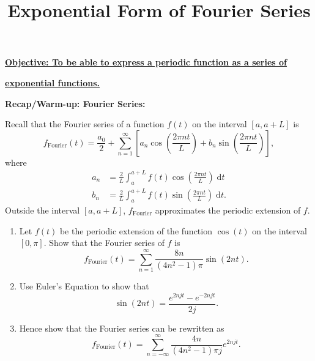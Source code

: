 \documentclass{article}
\newcommand{\diff}{\;\mathrm{d}}
\begin{document}
\title{Exponential Form of Fourier Series}
\date{}

\maketitle
\thispagestyle{empty}

\Large

\textbf{\underline{Objective: To be able to express a periodic function as a series of}}

\textbf{\underline{exponential functions.}}






\vspace{5mm}



\textbf{Recap/Warm-up: Fourier Series:}\bigskip



Recall that the Fourier series of a function $f(t)$ on the interval $[a,a+L]$ is
\[f_\mathrm{Fourier}(t)=\frac{a_0}{2}+\sum_{n=1}^\infty \left[a_n\cos\left(\frac{2\pi nt}{L}\right) + b_n\sin\left(\frac{2\pi nt}{L}\right)\right],\]
where
\begin{align*}
	a_n&=\frac{2}{L}\int_a^{a+L} f(t)\cos\left(\frac{2\pi nt}{L}\right)\diff t\\
	b_n&=\frac{2}{L}\int_a^{a+L} f(t)\sin\left(\frac{2\pi nt}{L}\right)\diff t.
\end{align*}
Outside the interval $[a,a+L]$, $f_\mathrm{Fourier}$ approximates the periodic extension of $f$.\bigskip


\begin{enumerate}
	\item Let $f(t)$ be the periodic extension of the function $\cos(t)$ on the interval $[0,\pi]$. Show that the Fourier series of $f$ is
		\[f_\mathrm{Fourier}(t) = \sum_{n=1}^\infty \frac{8n}{(4n^2-1)\pi}\sin(2nt).\]
	\item Use Euler's Equation to show that
		\[\sin(2nt) = \frac{e^{2njt} - e^{-2njt}}{2j}.\]
	\item Hence show that the Fourier series can be rewritten as
		\[f_\mathrm{Fourier}(t) = \sum_{n=-\infty}^\infty \frac{4n}{(4n^2-1)\pi j} e^{2njt}.\]
\end{enumerate}







\clearpage
\end{document}
